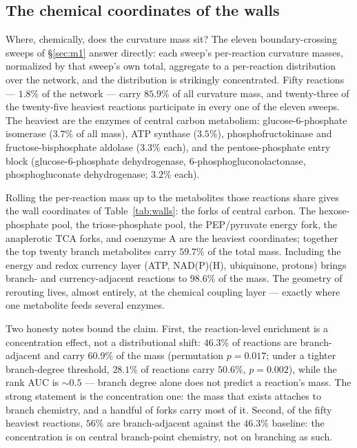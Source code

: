 \subsection{The chemical coordinates of the walls}\label{sec:walls}

Where, chemically, does the curvature mass sit? The eleven
boundary-crossing sweeps of \S\ref{sec:m1} answer directly: each
sweep's per-reaction curvature masses, normalized by that sweep's
own total, aggregate to a per-reaction distribution over the
network, and the distribution is strikingly concentrated. Fifty
reactions --- $1.8\%$ of the network --- carry $85.9\%$ of all
curvature mass, and twenty-three of the twenty-five heaviest
reactions participate in every one of the eleven sweeps. The
heaviest are the enzymes of central carbon metabolism:
glucose-6-phosphate isomerase ($3.7\%$ of all mass), ATP synthase
($3.5\%$), phosphofructokinase and fructose-bisphosphate aldolase
($3.3\%$ each), and the pentose-phosphate entry block
(glucose-6-phosphate dehydrogenase,
6-phosphogluconolactonase, phosphogluconate dehydrogenase; $3.2\%$
each).

Rolling the per-reaction mass up to the metabolites those
reactions share gives the wall coordinates of
Table~\ref{tab:walls}: the forks of central carbon. The
hexose-phosphate pool, the triose-phosphate pool, the PEP/pyruvate
energy fork, the anaplerotic TCA forks, and coenzyme A are the
heaviest coordinates; together the top twenty branch metabolites
carry $59.7\%$ of the total mass. Including the energy and redox
currency layer (ATP, NAD(P)(H), ubiquinone, protons) brings
branch- and currency-adjacent reactions to $98.6\%$ of the mass.
The geometry of rerouting lives, almost entirely, at the chemical
coupling layer --- exactly where one metabolite feeds several
enzymes.

Two honesty notes bound the claim. First, the reaction-level
enrichment is a concentration effect, not a distributional shift:
$46.3\%$ of reactions are branch-adjacent and carry $60.9\%$ of
the mass (permutation $p = 0.017$; under a tighter branch-degree
threshold, $28.1\%$ of reactions carry $50.6\%$, $p = 0.002$),
while the rank AUC is $\sim 0.5$ --- branch degree alone does not
predict a reaction's mass. The strong statement is the
concentration one: the mass that exists attaches to branch
chemistry, and a handful of forks carry most of it. Second, of the
fifty heaviest reactions, $56\%$ are branch-adjacent against the
$46.3\%$ baseline: the concentration is on central branch-point
chemistry, not on branching as such.

